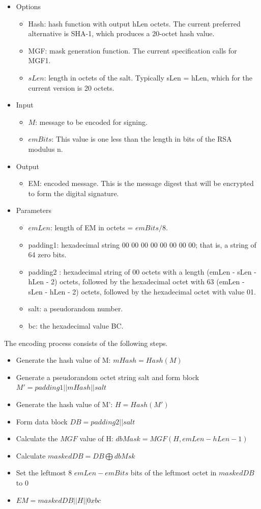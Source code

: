 \documentclass[12pt]{article}
\begin{document}
 \begin{itemize}
 	\item  Options
 	\begin{itemize}
 		\item Hash: hash function with output hLen octets. The current preferred alternative is SHA-1, which produces a 20-octet hash value.
 		\item MGF: mask generation function. The current specification calls for MGF1.
 		\item $sLen$: length in octets of the salt. Typically sLen = hLen, which for the
 		current version is 20 octets.
 	\end{itemize}
 	\item Input
 	\begin{itemize}
 		\item $M$: message to be encoded for signing.
 		\item $emBits$: This value is one less than the length in bits of the RSA modulus n.
 	\end{itemize}
 	\item Output
 	\begin{itemize}
 		\item EM: encoded message. This is the message digest that will be encrypted to form the digital signature.
 	\end{itemize}
 	\item Parameters
 	\begin{itemize}
 		\item $emLen$: length of EM in octets = $emBits/8$.
 		\item padding1: hexadecimal string 00 00 00 00 00 00 00 00; that is, a string of 64 zero bits.
 		\item padding2 : hexadecimal string of 00 octets with a length (emLen - sLen - hLen - 2) octets, followed by the hexadecimal octet with 63 (emLen - sLen - hLen - 2) octets, followed by the hexadecimal octet with value 01.
 		\item salt: a pseudorandom number.
 		\item bc: the hexadecimal value BC.
 	\end{itemize}
 \end{itemize}
The encoding process consists of the following steps.
\begin{itemize}
	\item Generate the hash value of M: $mHash = Hash(M)$
	\item Generate a pseudorandom octet string salt and form block $M' = padding1 || mHash || salt$
	\item Generate the hash value of M': $H = Hash(M')$
	\item Form data block $DB = padding2 || salt$
	\item Calculate the $MGF$ value of H: $dbMask = MGF(H, emLen - hLen - 1)$
	\item Calculate $maskedDB = DB \bigoplus dbMsk$
	\item Set the leftmost 8 $emLen - emBits$ bits of the leftmost octet in $maskedDB$ to 0
	\item $EM = maskedDB || H || 0xbc$
\end{itemize}
\end{document}
